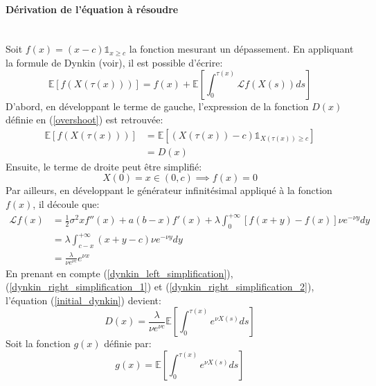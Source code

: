 \paragraph{Dérivation de l'équation à résoudre}\phantom{}\\
Soit $f(x)=(x-c)\mathds{1}_{x\geq c}$ la fonction mesurant un dépassement. En appliquant la formule de Dynkin (voir\cite{dynkin1965}), il est possible d'écrire:
\begin{equation}\label{initial_dynkin}
    \mathds{E}[f(X(\tau(x)))]=f(x)+\mathds{E}\left[\int_0^{\tau(x)}\mathcal{L}f(X(s))ds\right]
\end{equation}
D'abord, en développant le terme de gauche, l'expression de la fonction $D(x)$ définie en (\ref{overshoot}) est retrouvée:
\begin{equation}\label{dynkin_left_simplification}
    \begin{aligned}
        \mathds{E}[f(X(\tau(x)))]&=\mathds{E}\left[(X(\tau(x))-c)\mathds{1}_{X(\tau(x))\geq c}\right]\\
        &=D(x)
    \end{aligned}
\end{equation}
Ensuite, le terme de droite peut être simplifié: 
\begin{equation}\label{dynkin_right_simplification_1}
    X(0)=x\in(0,c)\implies f(x)=0
\end{equation}
Par ailleurs, en développant le générateur infinitésimal appliqué à la fonction $f(x)$, il découle que:
\begin{equation}\label{dynkin_right_simplification_2}
    \begin{aligned}
        \mathcal{L}f(x)&=\frac{1}{2}\sigma^2xf''(x)+a(b-x)f'(x)+\lambda\int_0^{+\infty}\left[f(x+y)-f(x)\right]\nu e^{-\nu y}dy \\
        &=\lambda\int_{c-x}^{+\infty}(x+y-c)\nu e^{-\nu y}dy \\
        &=\frac{\lambda}{\nu e^{\nu c}}e^{\nu x}
    \end{aligned}
\end{equation}
En prenant en compte (\ref{dynkin_left_simplification}), (\ref{dynkin_right_simplification_1}) et (\ref{dynkin_right_simplification_2}), l'équation (\ref{initial_dynkin}) devient:
\begin{equation}\label{simplified_dynkin}
    D(x)=\frac{\lambda}{\nu e^{\nu c}}\mathds{E}\left[\int_0^{\tau(x)}e^{\nu X(s)}ds\right]
\end{equation}
Soit la fonction $g(x)$ définie par:
\begin{equation}\label{g_defintion}
    g(x)=\mathds{E}\left[\int_0^{\tau(x)}e^{\nu X(s)}ds\right]
\end{equation}
